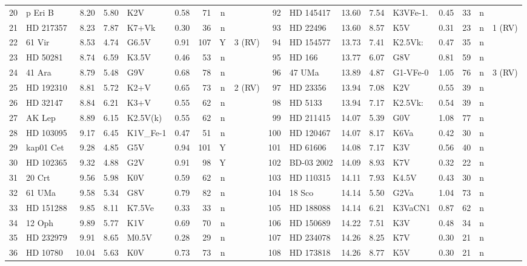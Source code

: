 \begin{landscape}
\begin{longtable}{r l r r l r r c l @{\;\vrule\;} r l r r l r r c l}
20 & p Eri B & 8.20 & 5.80 & K2V & 0.58 & 71 & n &  & 92 & HD 145417 & 13.60 & 7.54 & K3VFe-1. & 0.45 & 33 & n &  \\
21 & HD 217357 & 8.23 & 7.87 & K7+Vk & 0.30 & 36 & n &  & 93 & HD 22496 & 13.60 & 8.57 & K5V & 0.31 & 23 & n & 1 (RV) \\
22 & 61 Vir & 8.53 & 4.74 & G6.5V & 0.91 & 107 & Y & 3 (RV) & 94 & HD 154577 & 13.73 & 7.41 & K2.5Vk: & 0.47 & 35 & n &  \\
23 & HD 50281 & 8.74 & 6.59 & K3.5V & 0.46 & 53 & n &  & 95 & HD 166 & 13.77 & 6.07 & G8V & 0.81 & 59 & n &  \\
24 & 41 Ara & 8.79 & 5.48 & G9V & 0.68 & 78 & n &  & 96 & 47 UMa & 13.89 & 4.87 & G1-VFe-0 & 1.05 & 76 & n & 3 (RV) \\
25 & HD 192310 & 8.81 & 5.72 & K2+V & 0.65 & 73 & n & 2 (RV) & 97 & HD 23356 & 13.94 & 7.08 & K2V & 0.55 & 39 & n &  \\
26 & HD 32147 & 8.84 & 6.21 & K3+V & 0.55 & 62 & n &  & 98 & HD 5133 & 13.94 & 7.17 & K2.5Vk: & 0.54 & 39 & n &  \\
27 & AK Lep & 8.89 & 6.15 & K2.5V(k) & 0.55 & 62 & n &  & 99 & HD 211415 & 14.07 & 5.39 & G0V & 1.08 & 77 & n &  \\
28 & HD 103095 & 9.17 & 6.45 & K1V\_Fe-1 & 0.47 & 51 & n &  & 100 & HD 120467 & 14.07 & 8.17 & K6Va & 0.42 & 30 & n &  \\
29 & kap01 Cet & 9.28 & 4.85 & G5V & 0.94 & 101 & Y &  & 101 & HD 61606 & 14.08 & 7.17 & K3V & 0.56 & 40 & n &  \\
30 & HD 102365 & 9.32 & 4.88 & G2V & 0.91 & 98 & Y &  & 102 & BD-03 2002 & 14.09 & 8.93 & K7V & 0.32 & 22 & n &  \\
31 & 20 Crt & 9.56 & 5.98 & K0V & 0.59 & 62 & n &  & 103 & HD 110315 & 14.11 & 7.93 & K4.5V & 0.43 & 30 & n &  \\
32 & 61 UMa & 9.58 & 5.34 & G8V & 0.79 & 82 & n &  & 104 & 18 Sco & 14.14 & 5.50 & G2Va & 1.04 & 73 & n &  \\
33 & HD 151288 & 9.85 & 8.11 & K7.5Ve & 0.33 & 33 & n &  & 105 & HD 188088 & 14.14 & 6.21 & K3VaCN1 & 0.87 & 62 & n &  \\
34 & 12 Oph & 9.89 & 5.77 & K1V & 0.69 & 70 & n &  & 106 & HD 150689 & 14.22 & 7.51 & K3V & 0.48 & 34 & n &  \\
35 & HD 232979 & 9.91 & 8.65 & M0.5V & 0.28 & 29 & n &  & 107 & HD 234078 & 14.26 & 8.25 & K7V & 0.30 & 21 & n &  \\
36 & HD 10780 & 10.04 & 5.63 & K0V & 0.73 & 73 & n &  & 108 & HD 173818 & 14.26 & 8.77 & K5V & 0.30 & 21 & n &  \\

\end{longtable}
\end{landscape}
